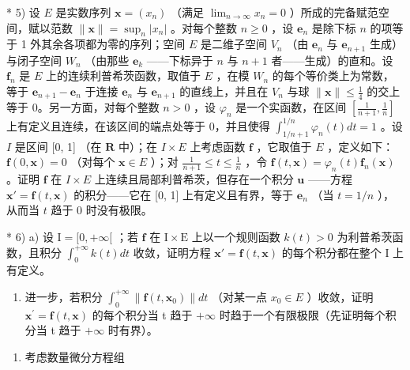 * 5) 设 \(E\) 是实数序列 \(\mathbf{x} = (x_{n})\) （满足 \(\lim_{n\to \infty}x_n = 0\) ）所成的完备赋范空间，赋以范数 \(\| \mathbf{x}\| = \sup_n|x_n|\) 。对每个整数 \(n\geqslant 0\) ，设 \(\mathbf{e}_n\) 是除下标 \(n\) 的项等于 1 外其余各项都为零的序列；空间 \(E\) 是二维子空间 \(V_{n}\) （由 \(\mathbf{e}_n\) 与 \(\mathbf{e}_{n + 1}\) 生成）与闭子空间 \(W_{n}\) （由那些 \(\mathbf{e}_k\) ——下标异于 \(n\) 与 \(n + 1\) 者——生成）的直和。设 \(\mathbf{f}_n\) 是 \(E\) 上的连续利普希茨函数，取值于 \(E\) ，在模 \(W_{n}\) 的每个等价类上为常数，等于 \(\mathbf{e}_{n + 1} - \mathbf{e}_n\) 于连接 \(\mathbf{e}_n\) 与 \(\mathbf{e}_{n + 1}\) 的直线上，并且在 \(V_{n}\) 与球 \(\| \mathbf{x}\| \leqslant \frac{1}{4}\) 的交上等于 0。另一方面，对每个整数 \(n > 0\) ，设 \(\varphi_{n}\) 是一个实函数，在区间 \(\left[\frac{1}{n + 1},\frac{1}{n}\right]\) 上有定义且连续，在该区间的端点处等于 0，并且使得 \(\int_{1 / n + 1}^{1 / n}\varphi_n(t)dt = 1\) 。设 \(I\) 是区间 {[}0, 1{]} （在 \(\mathbf{R}\) 中）；在 \(I\times E\) 上考虑函数 \(\mathbf{f}\) ，它取值于 \(E\) ，定义如下：\(\mathbf{f}(0,\mathbf{x}) = 0\) （对每个 \(\mathbf{x}\in E\) ）；对 \(\frac{1}{n + 1}\leqslant t\leqslant \frac{1}{n}\) ，令 \(\mathbf{f}(t,\mathbf{x}) = \varphi_n(t)\mathbf{f}_n(\mathbf{x})\) 。证明 \(\mathbf{f}\) 在 \(I\times E\) 上连续且局部利普希茨，但存在一个积分 \(\mathbf{u}\) ——方程 \(\mathbf{x}' = \mathbf{f}(t,\mathbf{x})\) 的积分——它在 {[}0, 1{]} 上有定义且有界，等于 \(\mathbf{e}_n\) （当 \(t = 1 / n\) ），从而当 \(t\) 趋于 0 时没有极限。

* 6) a) 设 \(\mathrm{I} = [0, +\infty[\) ；若 \(\mathbf{f}\) 在 \(\mathrm{I} \times \mathrm{E}\) 上以一个规则函数 \(k(t) > 0\) 为利普希茨函数，且积分 \(\int_0^{+\infty} k(t) dt\) 收敛，证明方程 \(\mathbf{x}' = \mathbf{f}(t, \mathbf{x})\) 的每个积分都在整个 \(\mathrm{I}\) 上有定义。

\begin{enumerate}
\def\labelenumi{\alph{enumi})}
\setcounter{enumi}{1}
\tightlist
\item
  进一步，若积分 \(\int_{0}^{+\infty}\|\mathbf{f}(t,\mathbf{x}_{0})\|dt\) （对某一点 \(x_{0}\in E\) ）收敛，证明 \(\mathbf{x}^{\prime}=\mathbf{f}(t,\mathbf{x})\) 的每个积分当 t 趋于 \(+\infty\) 时趋于一个有限极限（先证明每个积分当 t 趋于 \(+\infty\) 时有界）。
\end{enumerate}

\begin{enumerate}
\def\labelenumi{\arabic{enumi})}
\setcounter{enumi}{6}
\tightlist
\item
  考虑数量微分方程组
\end{enumerate}

